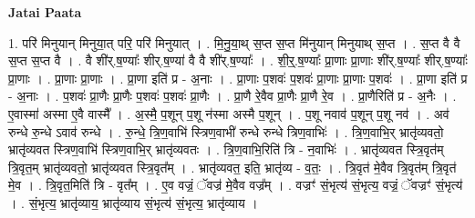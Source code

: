 \documentclass[17pt]{extarticle}
\begin{document}
\textbf{Jatai Paata} \newline

1. परि॑ मिनुयान् मिनुया॒त् परि॒ परि॑ मिनुयात् । . मि॒नु॒या॒थ् स॒प्त स॒प्त मि॑नुयान् मिनुयाथ् स॒प्त । . स॒प्त वै वै स॒प्त स॒प्त वै । . वै शी॑र्.ष॒ण्याः᳚ शीर्.ष॒ण्या॑ वै वै शी॑र्.ष॒ण्याः᳚ । . शी॒र्॒.ष॒ण्याः᳚ प्रा॒णाः प्रा॒णाः शी॑र्.ष॒ण्याः᳚ शीर्.ष॒ण्याः᳚ प्रा॒णाः । . प्रा॒णाः प्रा॒णाः । . प्रा॒णा इति॑ प्र - अ॒नाः । . प्रा॒णाः प॒शवः॑ प॒शवः॑ प्रा॒णाः प्रा॒णाः प॒शवः॑ । . प्रा॒णा इति॑ प्र - अ॒नाः । . प॒शवः॑ प्रा॒णैः प्रा॒णैः प॒शवः॑ प॒शवः॑ प्रा॒णैः । . प्रा॒णै रे॒वैव प्रा॒णैः प्रा॒णै रे॒व । . प्रा॒णैरिति॑ प्र - अ॒नैः । . ए॒वास्मा॑ अस्मा ए॒वै वास्मै᳚ । . अ॒स्मै॒ प॒शून् प॒शू न॑स्मा अस्मै प॒शून् । . प॒शू नवाव॑ प॒शून् प॒शू नव॑ । . अव॑ रुन्धे रु॒न्धे ऽवाव॑ रुन्धे । . रु॒न्धे॒ त्रि॒ण॒वाभि॑ स्त्रिण॒वाभी॑ रुन्धे रुन्धे त्रिण॒वाभिः॑ । . त्रि॒ण॒वाभि॒र् भ्रातृ॑व्यवतो॒ भ्रातृ॑व्यवत स्त्रिण॒वाभि॑ स्त्रिण॒वाभि॒र् भ्रातृ॑व्यवतः । . त्रि॒ण॒वाभि॒रिति॑ त्रि - न॒वाभिः॑ । . भ्रातृ॑व्यवत स्त्रि॒वृत॑म् त्रि॒वृत॒म् भ्रातृ॑व्यवतो॒ भ्रातृ॑व्यवत स्त्रि॒वृत᳚म् । . भ्रातृ॑व्यवत॒ इति॒ भ्रातृ॑व्य - व॒तः॒ । . त्रि॒वृत॑ मे॒वैव त्रि॒वृत॑म् त्रि॒वृत॑ मे॒व । . त्रि॒वृत॒मिति॑ त्रि - वृत᳚म् । . ए॒व वज्रं॒ ॅवज्र॑ मे॒वैव वज्र᳚म् । . वज्रꣳ॑ सं॒भृत्य॑ सं॒भृत्य॒ वज्रं॒ ॅवज्रꣳ॑ सं॒भृत्य॑ । . सं॒भृत्य॒ भ्रातृ॑व्याय॒ भ्रातृ॑व्याय सं॒भृत्य॑ सं॒भृत्य॒ भ्रातृ॑व्याय । \newline
\end{document}
